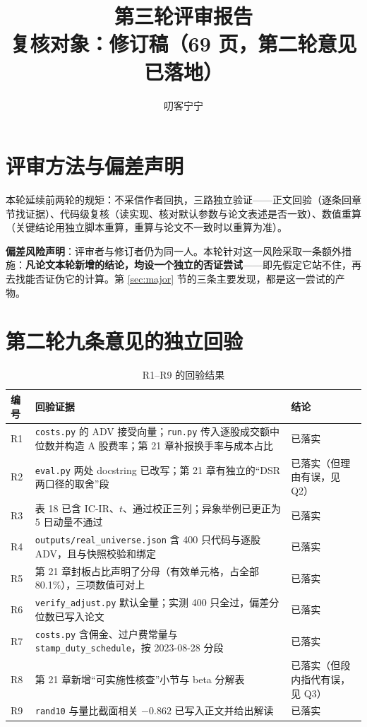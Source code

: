 \documentclass[11pt,a4paper]{ctexart}
\title{\bfseries 第三轮评审报告\\\large 复核对象：修订稿（69 页，第二轮意见已落地）}
\author{\large 叨客宁宁}
\date{}
\begin{document}
\maketitle

\section{评审方法与偏差声明}

本轮延续前两轮的规矩：不采信作者回执，三路独立验证——正文回验（逐条回章节找证据）、代码级复核（读实现、核对默认参数与论文表述是否一致）、数值重算（关键结论用独立脚本重算，重算与论文不一致时以重算为准）。

\textbf{偏差风险声明}：评审者与修订者仍为同一人。本轮针对这一风险采取一条额外措施：\textbf{凡论文本轮新增的结论，均设一个独立的否证尝试}——即先假定它站不住，再去找能否证伪它的计算。第 \ref{sec:major} 节的三条主要发现，都是这一尝试的产物。

\section{第二轮九条意见的独立回验}

\begin{table}[htbp]
\centering
\caption{R1--R9 的回验结果}
\label{tab:r2status}
\begin{tabular}{@{}>{\raggedright\arraybackslash}p{0.9cm}>{\raggedright\arraybackslash}p{11.4cm}>{\raggedright\arraybackslash}p{1.3cm}@{}}
\toprule
编号 & 回验证据 & 结论 \\
\midrule
R1 & \texttt{costs.py} 的 ADV 接受向量；\texttt{run.py} 传入逐股成交额中位数并构造 A 股费率；第 21 章补报换手率与成本占比 & 已落实 \\
R2 & \texttt{eval.py} 两处 docstring 已改写；第 21 章有独立的“DSR 两口径的取舍”段 & 已落实（但理由有误，见 Q2） \\
R3 & 表 18 已含 IC-IR、$t$、通过校正三列；异象举例已更正为 5 日动量不通过 & 已落实 \\
R4 & \texttt{outputs/real\_universe.json} 含 400 只代码与逐股 ADV，且与快照校验和绑定 & 已落实 \\
R5 & 第 21 章封板占比声明了分母（有效单元格，占全部 80.1\%），三项数值可对上 & 已落实 \\
R6 & \texttt{verify\_adjust.py} 默认全量；实测 400 只全过，偏差分位数已写入论文 & 已落实 \\
R7 & \texttt{costs.py} 含佣金、过户费常量与 \texttt{stamp\_duty\_schedule}，按 2023-08-28 分段 & 已落实 \\
R8 & 第 21 章新增“可实施性核查”小节与 beta 分解表 & 已落实（但段内指代有误，见 Q3） \\
R9 & \texttt{rand10} 与量比截面相关 $-0.862$ 已写入正文并给出解读 & 已落实 \\
\bottomrule
\end{tabular}
\end{table}
\end{document}
